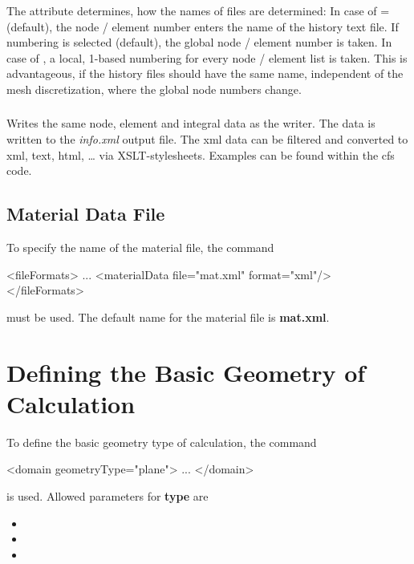 The  attribute determines, how the names of files are
determined: In case of  =  (default), the node /
element number enters the name of the history text file. If 
numbering is selected (default), the global node / element number is taken. In
case of , a local, 1-based numbering for every node / element
list is taken. This is advantageous, if the history files should have the same
name, independent of the mesh discretization, where the global node numbers
change.

\subsubsection{}
Writes the same node, element and integral data as the  writer.
The data is written to the \textit{info.xml} output file. The xml data can be
filtered and converted to xml, text, html, \ldots
via XSLT-stylesheets. Examples can be found within the cfs code.  
\\

\subsection{Material Data File}
To specify the name of the material file, the command 
\begin{xmllisting}
<fileFormats>
...
	<materialData file="mat.xml" format="xml"/>
</fileFormats>
\end{xmllisting}
must be used. The default name for the material file is {\bf mat.xml}.


\section{Defining the Basic Geometry of Calculation}
To define the basic geometry type of calculation, the command
\begin{xmllisting} 
<domain geometryType="plane">
...
</domain>
\end{xmllisting} 
is used. Allowed parameters for {\bf type} are
{\bf 
\begin{itemize}
\item {}
\item {}
\item {}
\end{itemize}}

